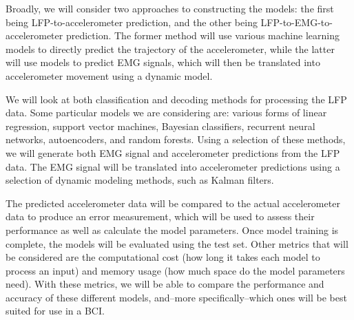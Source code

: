 \documentclass[12pt]{article}
\begin{document}
Broadly, we will consider two approaches to constructing the models: the first being LFP-to-accelerometer prediction, and the other being LFP-to-EMG-to-accelerometer prediction. The former method will use various machine learning models to directly predict the trajectory of the accelerometer, while the latter will use models to predict EMG signals, which will then be translated into accelerometer movement using a dynamic model.

We will look at both classification and decoding methods for processing the LFP data. Some particular models we are considering are: various forms of linear regression, support vector machines, Bayesian classifiers, recurrent neural networks, autoencoders, and random forests. Using a selection of these methods, we will generate both EMG signal and accelerometer predictions from the LFP data. The EMG signal will be translated into accelerometer predictions using a selection of dynamic modeling methods, such as Kalman filters.

The predicted accelerometer data will be compared to the actual accelerometer data to produce an error measurement, which will be used to assess their performance as well as calculate the model parameters. Once model training is complete, the models will be evaluated using the test set. Other metrics that will be considered are the computational cost (how long it takes each model to process an input) and memory usage (how much space do the model parameters need). With these metrics, we will be able to compare the performance and accuracy of these different models, and--more specifically--which ones will be best suited for use in a BCI.
\end{document}
